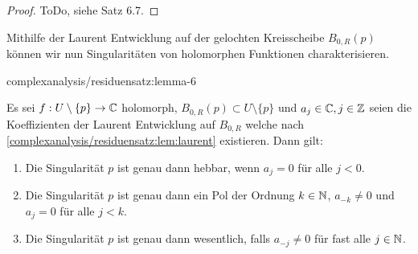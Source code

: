 \begin{proof}
 ToDo, siehe \cite{Nee17} Satz 6.7.
\end{proof}

\par
Mithilfe der Laurent Entwicklung auf der gelochten Kreisscheibe \(B_{0,R}(p)\) können wir nun Singularitäten von holomorphen Funktionen charakterisieren.
\begin{lemma}{}{complexanalysis/residuensatz:lemma-6}



\par
Es sei \(f:U\setminus\{p\}\to\mathbb{C}\) holomorph, \(B_{0,R}(p)\subset U\setminus\{p\}\) und \(a_j\in\mathbb{C}, j\in\mathbb{Z}\) seien die Koeffizienten der Laurent Entwicklung auf \(B_{0,R}\) welche nach \cref{complexanalysis/residuensatz:lem:laurent} existieren. Dann gilt:
\begin{enumerate}

\item {} 
\par
Die Singularität \(p\) ist genau dann hebbar, wenn \(a_{j}=0\) für alle \(j<0\).

\item {} 
\par
Die Singularität \(p\) ist genau dann ein Pol der Ordnung \(k\in\mathbb{N}\), \(a_{-k}\neq 0\) und \(a_j = 0\) für alle \(j<k\).

\item {} 
\par
Die Singularität \(p\) ist genau dann wesentlich, falls \(a_{-j}\neq 0\) für fast alle \(j\in\mathbb{N}\).

\end{enumerate}
\end{lemma}

